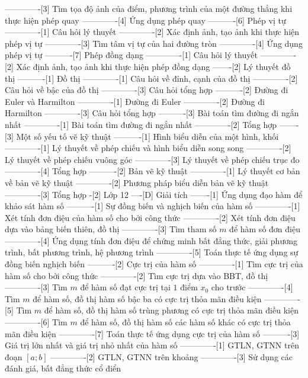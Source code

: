 -------------[3] Tìm tọa độ ảnh của điểm, phương trình của một đường thẳng khi thực hiện phép quay
-------------[4] Ứng dụng phép quay
----------[6] Phép vị tự
-------------[1] Câu hỏi lý thuyết
-------------[2] Xác định ảnh, tạo ảnh khi thực hiện phép vị tự
-------------[3] Tìm tâm vị tự của hai đường tròn
-------------[4] Ứng dụng phép vị tự
----------[7] Phép đồng dạng
-------------[1] Câu hỏi lý thuyết
-------------[2] Xác định ảnh, tạo ảnh khi thực hiện phép đồng dạng
-------[2] Lý thuyết đồ thị
----------[1] Đồ thị
-------------[1] Câu hỏi về đỉnh, cạnh của đồ thị
-------------[2] Câu hỏi về bậc của đồ thị
-------------[3] Câu hỏi tổng hợp
----------[2] Đường đi Euler và Harmilton
-------------[1] Đường đi Euler
-------------[2] Đường đi Harmilton
-------------[3] Câu hỏi tổng hợp
----------[3] Bài toán tìm đường đi ngắn nhất
-------------[1] Bài toán tìm đường đi ngắn nhất
-------------[2] Tổng hợp
-------[3] Một số yếu tố vẽ kỹ thuật
----------[1] Hình biểu diễn của một hình, khối
-------------[1] Lý thuyết về phép chiếu và hình biểu diễn song song
-------------[2] Lý thuyết về phép chiếu vuông góc
-------------[3] Lý thuyết về phép chiếu trục đo
-------------[4] Tổng hợp
----------[2] Bản vẽ kỹ thuật
-------------[1] Lý thuyết cơ bản về bản vẽ kỹ thuật
-------------[2] Phương pháp biểu diễn bản vẽ kỹ thuật
-------------[3] Tổng hợp
-[2] Lớp 12
----[D] Giải tích
-------[1] Ứng dụng đạo hàm để khảo sát hàm số
----------[1] Sự đồng biến và nghịch biến của hàm số
-------------[1] Xét tính đơn điệu của hàm số cho bởi công thức
-------------[2] Xét tính đơn điệu dựa vào bảng biến thiên, đồ thị
-------------[3] Tìm tham số $ m $ để hàm số đơn điệu
-------------[4] Ứng dụng tính đơn điệu để chứng minh bất đẳng thức, giải phương trình, bất phương trình, hệ phương trình
-------------[5] Toán thực tế ứng dụng sự đồng biến nghịch biến
----------[2] Cực trị của hàm số
-------------[1] Tìm cực trị của hàm số cho bởi công thức
-------------[2] Tìm cực trị dựa vào BBT, đồ thị
-------------[3] Tìm $ m $ để hàm số đạt cực trị tại $ 1 $ điểm $ x_0 $ cho trước
-------------[4] Tìm $ m $ để hàm số, đồ thị hàm số bậc ba có cực trị thỏa mãn điều kiện
-------------[5] Tìm $ m $ để hàm số, đồ thị hàm số trùng phương có cực trị thỏa mãn điều kiện
-------------[6] Tìm $ m $ để hàm số, đồ thị hàm số các hàm số khác có cực trị thỏa mãn điều kiện
-------------[7] Toán thực tế ứng dụng cực trị của hàm số
----------[3] Giá trị lớn nhất và giá trị nhỏ nhất của hàm số
-------------[1] GTLN, GTNN trên đoạn $ \left[a;b\right] $
-------------[2] GTLN, GTNN trên khoảng
-------------[3] Sử dụng các đánh giá, bất đẳng thức cổ điển
